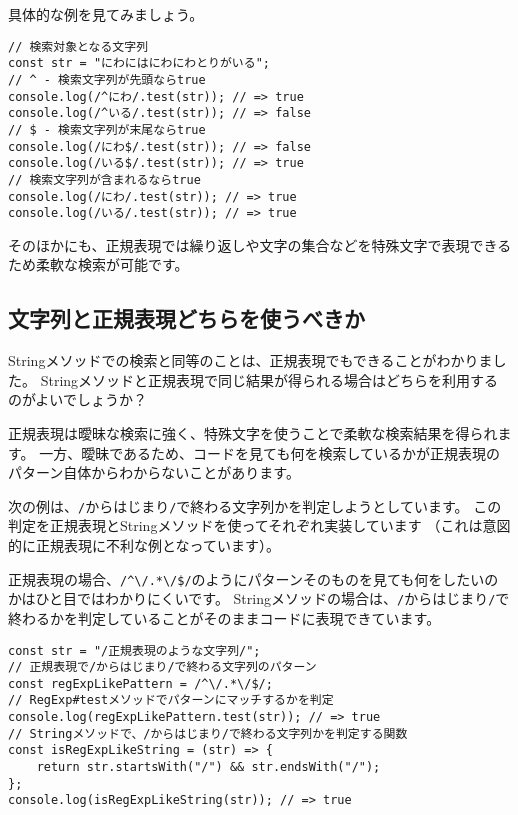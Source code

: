 具体的な例を見てみましょう。

\begin{lstlisting}
// 検索対象となる文字列
const str = "にわにはにわにわとりがいる";
// ^ - 検索文字列が先頭ならtrue
console.log(/^にわ/.test(str)); // => true
console.log(/^いる/.test(str)); // => false
// $ - 検索文字列が末尾ならtrue
console.log(/にわ$/.test(str)); // => false
console.log(/いる$/.test(str)); // => true
// 検索文字列が含まれるならtrue
console.log(/にわ/.test(str)); // => true
console.log(/いる/.test(str)); // => true
\end{lstlisting}

そのほかにも、正規表現では繰り返しや文字の集合などを特殊文字で表現できるため柔軟な検索が可能です。

\hypertarget{string-or-regexp}{%
\subsection{文字列と正規表現どちらを使うべきか}\label{string-or-regexp}}

Stringメソッドでの検索と同等のことは、正規表現でもできることがわかりました。
Stringメソッドと正規表現で同じ結果が得られる場合はどちらを利用するのがよいでしょうか？

正規表現は曖昧な検索に強く、特殊文字を使うことで柔軟な検索結果を得られます。
一方、曖昧であるため、コードを見ても何を検索しているかが正規表現のパターン自体からわからないことがあります。

次の例は、\texttt{/}からはじまり\texttt{/}で終わる文字列かを判定しようとしています。
この判定を正規表現とStringメソッドを使ってそれぞれ実装しています
（これは意図的に正規表現に不利な例となっています）。

正規表現の場合、\texttt{/\^{}\textbackslash/.*\textbackslash/\$/}のようにパターンそのものを見ても何をしたいのかはひと目ではわかりにくいです。
Stringメソッドの場合は、\texttt{/}からはじまり\texttt{/}で終わるかを判定していることがそのままコードに表現できています。

\begin{lstlisting}
const str = "/正規表現のような文字列/";
// 正規表現で/からはじまり/で終わる文字列のパターン
const regExpLikePattern = /^\/.*\/$/;
// RegExp#testメソッドでパターンにマッチするかを判定
console.log(regExpLikePattern.test(str)); // => true
// Stringメソッドで、/からはじまり/で終わる文字列かを判定する関数
const isRegExpLikeString = (str) => {
    return str.startsWith("/") && str.endsWith("/");
};
console.log(isRegExpLikeString(str)); // => true
\end{lstlisting}

